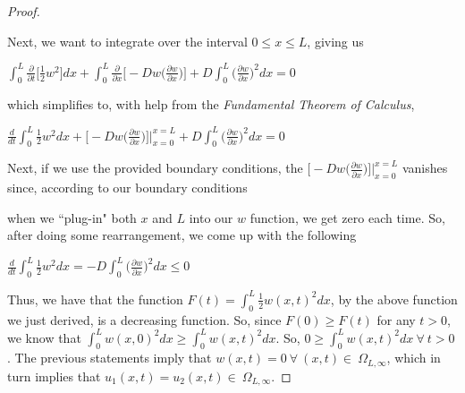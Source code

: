 \documentclass[executivepaper]{article}
\begin{document}
\begin{flushleft}
\begin{proof}
\begin{center}
\end{center}

\vspace{2mm}

Next, we want to integrate over the interval $0 \leq x \leq L$, giving us

\begin{center}

$\int_{0}^{L} \frac{\partial}{\partial t} \bigg[\frac{1}{2} w^2\bigg] dx + \int_{0}^{L} \frac{\partial}{\partial x} \bigg[-Dw \bigg(\frac{\partial w}{\partial x}\bigg)\bigg] + D \int_{0}^{L} \bigg(\frac{\partial w}{\partial x}\bigg)^2 dx=0$

\end{center}

which simplifies to, with help from the \textit{Fundamental Theorem of Calculus},

\begin{center}

$\frac{d}{dt} \int_{0}^{L} \frac{1}{2}w^2 dx + \bigg[-Dw \bigg(\frac{\partial w}{\partial x}\bigg)\bigg] \Big |_{x=0}^{x=L} + D \int_{0}^{L} \bigg(\frac{\partial w}{\partial x}\bigg)^2 dx=0$

\end{center}

\vspace{2mm}

Next, if we use the provided boundary conditions, the $\bigg[-Dw \bigg(\frac{\partial w}{\partial x}\bigg)\bigg] \Big |_{x=0}^{x=L}$ vanishes since, according to our boundary conditions

\vspace{2mm}

when we ``plug-in" both $x$ and $L$ into our $w$ function, we get zero each time. So, after doing some rearrangement, we come up with the following

\begin{center}

$\frac{d}{dt} \int_{0}^{L} \frac{1}{2}w^2 dx=-D \int_{0}^{L} \bigg(\frac{\partial w}{\partial x}\bigg)^2 dx \leq 0$

\end{center}

\pagebreak

\vspace*{-40mm}

Thus, we have that the function $F(t)=\int_{0}^{L} \frac{1}{2}w(x,t)^2 dx$, by the above function we just derived, is a decreasing function. So, since $F(0) \geq F(t)$ for any $t > 0$, we know that $\int_{0}^{L} w(x,0)^2 dx \geq \int_{0}^{L} w(x,t)^2 dx$. So, $0 \geq \int_{0}^{L} w(x,t)^2 dx {~} \forall {~} t > 0$. The previous statements imply that $w(x,t)=0 {~} \forall {~} (x,t) \in {~} \Omega_{L,\infty}$, which in turn implies that $u_{1}(x,t)=u_{2}(x,t) \in {~} \Omega_{L,\infty}$.

\end{proof}

\end{flushleft}
\end{document}
